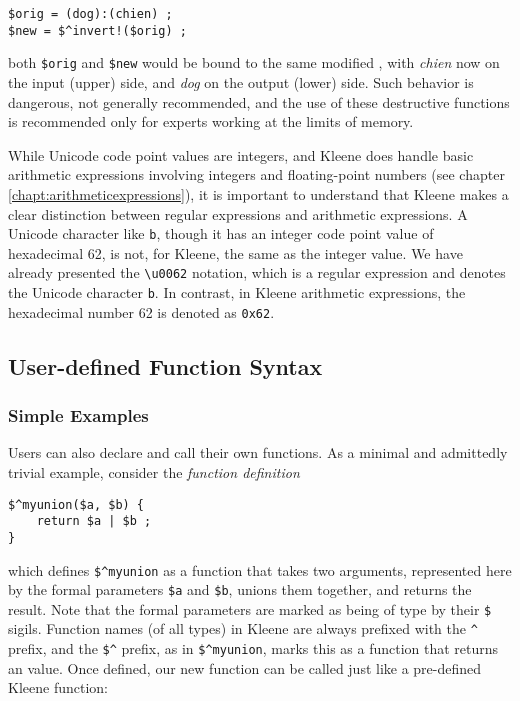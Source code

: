\begin{Verbatim}
$orig = (dog):(chien) ;
$new = $^invert!($orig) ;
\end{Verbatim}

\noindent
both \verb!$orig! and \verb!$new! would be bound to the same
modified \fsm{}, with \emph{chien} now on the input (upper) side, and \emph{dog} on
the output (lower) side.  Such behavior is dangerous, not generally recommended, and the use of these
destructive functions is recommended only for experts working at the limits
of memory.

While Unicode code point values are integers, and Kleene does handle basic
arithmetic expressions involving integers and floating-point numbers (see chapter
\ref{chapt:arithmeticexpressions}), it is important to understand
that Kleene makes a clear distinction between regular expressions and arithmetic expressions.
A Unicode character like \texttt{b}, though it has an integer code point value of hexadecimal 62, is
not, for Kleene, the same as the integer value.  We have already presented the \verb!\u0062! notation,
which is a regular expression and denotes the Unicode character \texttt{b}.  In contrast, in Kleene arithmetic
expressions, the hexadecimal number 62 is denoted as \texttt{0x62}.  

\subsection{User-defined Function Syntax}

\subsubsection{Simple Examples}

Users can also declare and call their own functions.  As a minimal and admittedly
trivial example, consider the
\emph{function definition}

\begin{Verbatim}
$^myunion($a, $b) {
    return $a | $b ;
}
\end{Verbatim}

\noindent
which defines \verb!$^myunion! as a function that takes two \fsm{} arguments, represented here by the formal
parameters \verb!$a! and \verb!$b!, unions them together, and returns the \fsm{} result.  Note that the formal
parameters are marked as being of type \fsm{} by their \verb!$! sigils.  Function names (of all types) 
in Kleene are always
prefixed with the \verb!^! prefix, and the \verb!$^! prefix, as in \verb!$^myunion!, marks this as a function
that
returns an \fsm{} value.  Once defined, our new function can be called just like a pre-defined Kleene function:

